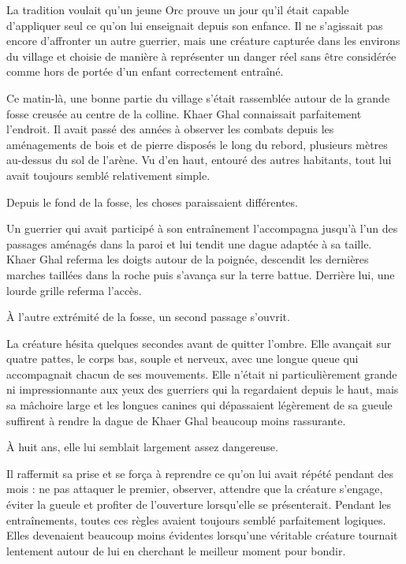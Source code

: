 La tradition voulait qu'un jeune Orc prouve un jour qu'il était capable
d'appliquer seul ce qu'on lui enseignait depuis son enfance. Il ne s'agissait
pas encore d'affronter un autre guerrier, mais une créature capturée dans les
environs du village et choisie de manière à représenter un danger réel sans
être considérée comme hors de portée d'un enfant correctement entraîné.

Ce matin-là, une bonne partie du village s'était rassemblée autour de la grande
fosse creusée au centre de la colline. Khaer Ghal connaissait parfaitement
l'endroit. Il avait passé des années à observer les combats depuis les
aménagements de bois et de pierre disposés le long du rebord, plusieurs mètres
au-dessus du sol de l'arène. Vu d'en haut, entouré des autres habitants, tout
lui avait toujours semblé relativement simple.

Depuis le fond de la fosse, les choses paraissaient différentes.

Un guerrier qui avait participé à son entraînement l'accompagna jusqu'à l'un
des passages aménagés dans la paroi et lui tendit une dague adaptée à sa
taille. Khaer Ghal referma les doigts autour de la poignée, descendit les
dernières marches taillées dans la roche puis s'avança sur la terre battue.
Derrière lui, une lourde grille referma l'accès.

À l'autre extrémité de la fosse, un second passage s'ouvrit.

La créature hésita quelques secondes avant de quitter l'ombre. Elle avançait
sur quatre pattes, le corps bas, souple et nerveux, avec une longue queue qui
accompagnait chacun de ses mouvements. Elle n'était ni particulièrement grande
ni impressionnante aux yeux des guerriers qui la regardaient depuis le haut,
mais sa mâchoire large et les longues canines qui dépassaient légèrement de sa
gueule suffirent à rendre la dague de Khaer Ghal beaucoup moins rassurante.

À huit ans, elle lui semblait largement assez dangereuse.

Il raffermit sa prise et se força à reprendre ce qu'on lui avait répété pendant
des mois : ne pas attaquer le premier, observer, attendre que la créature
s'engage, éviter la gueule et profiter de l'ouverture lorsqu'elle se
présenterait. Pendant les entraînements, toutes ces règles avaient toujours
semblé parfaitement logiques. Elles devenaient beaucoup moins évidentes
lorsqu'une véritable créature tournait lentement autour de lui en cherchant le
meilleur moment pour bondir.

